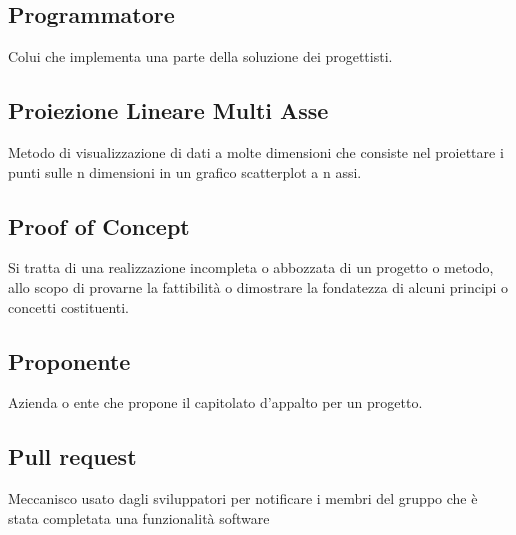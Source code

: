 \documentclass[../glossario.tex]{subfiles}
\begin{document}
\subsection*{Programmatore} 
Colui che implementa una parte della soluzione dei progettisti.

\subsection*{Proiezione Lineare Multi Asse}
Metodo di visualizzazione di dati a molte dimensioni che consiste nel proiettare i punti sulle n dimensioni in un grafico scatterplot a n assi. 

\subsection*{Proof of Concept} 
Si tratta di una realizzazione incompleta o abbozzata di un progetto o metodo, allo scopo di provarne la fattibilità o dimostrare la fondatezza di alcuni principi o concetti costituenti.

\subsection*{Proponente} 
Azienda o ente che propone il capitolato d'appalto per un progetto.

\subsection*{Pull request} 
Meccanisco usato dagli sviluppatori per notificare i membri del gruppo che è stata completata una funzionalità software



    
\end{document}
